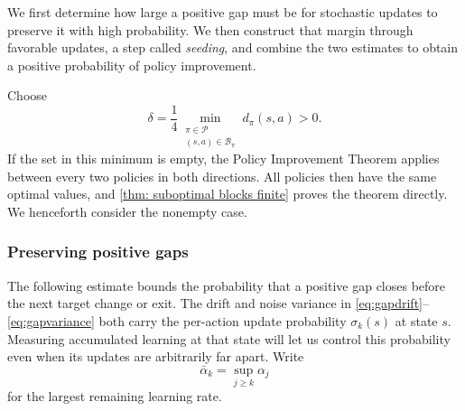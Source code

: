 \documentclass[twoside,11pt]{article}
\DeclareRobustCommand{\reviewbarstart}{%
  \ifhmode %
    \vadjust{\vbox to 0pt{%
      \vskip-\ht\strutbox %
      \vskip-\dp\strutbox %
      \cbstart[\changebarwidth] %
      \vss %
    }}%
  \else %
    \cbstart[\changebarwidth]%
  \fi %
} %
\providecommand{\DIFadd}[1]{#1} %
\providecommand{\DIFaddbegin}{\reviewbarstart} %
\providecommand{\DIFaddend}{\protect\cbend} %
\def\DIFadd#1{#1}%
\def\DIFaddbegin{}%
\def\DIFaddend{}%
\begin{document}
 \DIFaddbegin \DIFadd{We first determine how large a positive gap must be for stochastic updates to preserve it with high probability. We then construct that margin through favorable updates, a step called \emph{seeding}, and combine the two estimates to obtain a positive probability of policy improvement.
}

\DIFadd{Choose
}\begin{equation}
\DIFadd{\label{eq:constants}
\delta=\frac{1}{4}\min_{\substack{\pi\in\mathcal P\\(s,a)\in\mathcal B_\pi}}d_\pi(s,a)>0.
}\end{equation}\DIFaddend 
 \DIFaddbegin \DIFadd{If the set in this minimum is empty, the Policy Improvement Theorem applies between every two policies in both directions. All policies then have the same optimal values, }\DIFaddend and  \DIFaddbegin \DIFadd{\autoref{thm: suboptimal blocks finite} proves the theorem directly. We henceforth consider the nonempty case.
}

\subsubsection{\DIFadd{Preserving positive gaps}}
\DIFadd{The following estimate bounds the probability that a positive gap closes before the next target change or exit. The drift and noise variance in \eqref{eq:gapdrift}--\eqref{eq:gapvariance} both carry the per-action update probability $\sigma_k(s)$ at state $s$. Measuring accumulated learning at that state will let us control this probability even when its updates are arbitrarily far apart. Write
}\[
\DIFadd{\bar\alpha_k=\sup_{j\ge k}\alpha_j
}\]\DIFaddend 
 \DIFaddbegin \DIFadd{for the largest remaining learning rate.
}\DIFaddend 
\end{document}
